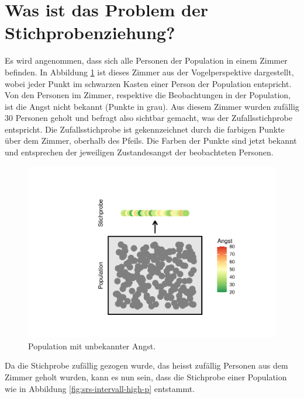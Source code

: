 \documentclass[
]{book}
\theoremstyle{definition}
\theoremstyle{definition}
\theoremstyle{definition}
\theoremstyle{definition}
\theoremstyle{remark}
\begin{document}
\section{Was ist das Problem der Stichprobenziehung?}\label{stichprobenziehung-problem}

Es wird angenommen, dass sich alle Personen der Population in einem Zimmer befinden. In Abbildung \ref{fig:srs-intervall-nocol} ist dieses Zimmer aus der Vogelperspektive dargestellt, wobei jeder Punkt im schwarzen Kasten einer Person der Population entspricht. Von den Personen im Zimmer, respektive die Beobachtungen in der Population, ist die Angst nicht bekannt (Punkte in grau). Aus diesem Zimmer wurden zufällig 30 Personen geholt und befragt also sichtbar gemacht, was der Zufallsstichprobe entspricht. Die Zufallsstichprobe ist gekennzeichnet durch die farbigen Punkte über dem Zimmer, oberhalb des Pfeils. Die Farben der Punkte sind jetzt bekannt und entsprechen der jeweiligen Zustandesangst der beobachteten Personen.

\begin{figure}

{\centering \includegraphics{aps_statistik1_files/figure-latex/srs-intervall-nocol-1} 

}

\caption{Population mit unbekannter Angst.}\label{fig:srs-intervall-nocol}
\end{figure}

Da die Stichprobe zufällig gezogen wurde, das heisst zufällig Personen aus dem Zimmer geholt wurden, kann es nun sein, dass die Stichprobe einer Population wie in Abbildung \ref{fig:srs-intervall-high-p} entstammt.
\end{document}
